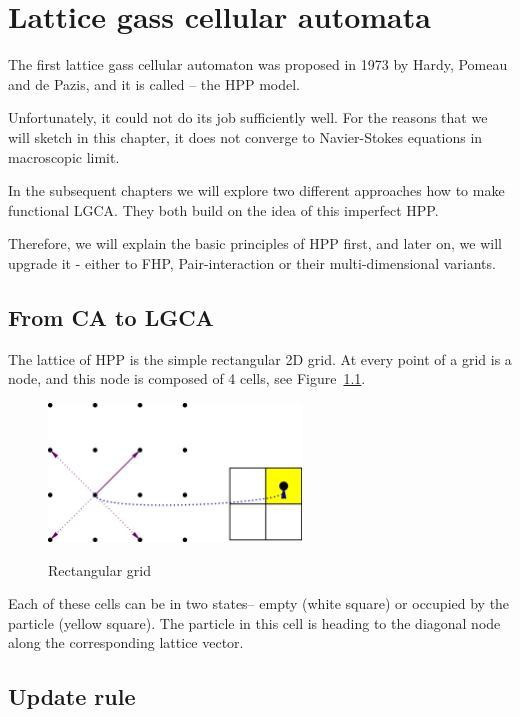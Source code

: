 \chapter{Lattice gass cellular automata}
The first lattice gass cellular automaton was proposed in 1973 by Hardy, Pomeau and de Pazis, and it is called -- the HPP model.

Unfortunately, it could not do its job sufficiently well. For the reasons that we will sketch in this chapter, it does not converge to Navier-Stokes equations in macroscopic limit.

\bigskip

In the subsequent chapters we will explore two different approaches how to make functional LGCA. They both build on the idea of this imperfect HPP.

Therefore, we will explain the basic principles of HPP first, and later on, we will upgrade it - either to FHP, Pair-interaction or their multi-dimensional variants.

\section{From CA to LGCA}

The lattice of HPP is the simple rectangular 2D grid. At every point of a grid is a node, and this node is composed of 4 cells, see Figure~\ref{rectangular}.

\begin{figure}[htbp]
 \centering
 \includegraphics[width=0.6\textwidth]{./img/hppnode}
 \label{rectangular}
 \caption{Rectangular grid}
\end{figure}

Each of these cells can be in two states-- empty (white square) or occupied by the particle (yellow square).
The particle in this cell is heading to the diagonal node along the corresponding lattice vector.

\section{Update rule}

